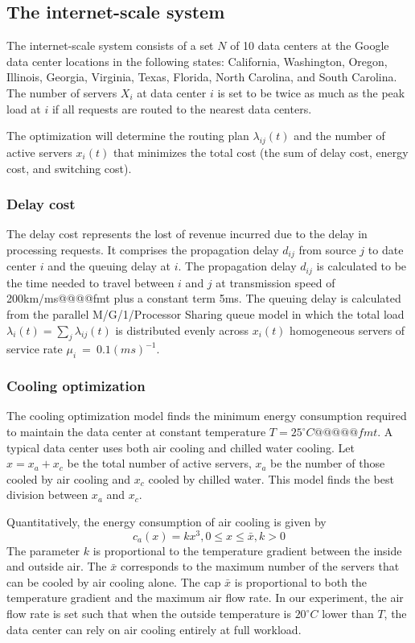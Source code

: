 \documentclass{acm_proc_article-sp}
\begin{document}
\subsection{The internet-scale system}
The internet-scale system consists of a set $N$ of 10 data centers at the Google data center locations in the following states: California, Washington, Oregon, Illinois, Georgia, Virginia, Texas, Florida, North Carolina, and South Carolina. The number of servers $X_i$ at data center $i$ is set to be twice as much as the peak load at $i$ if all requests are routed to the nearest data centers.

The optimization will determine the routing plan $\lambda_{ij}(t)$ and the number of active servers $x_i(t)$ that minimizes the total cost (the sum of delay cost, energy cost, and switching cost).

\subsubsection{Delay cost}
The delay cost represents the lost of revenue incurred due to the delay in processing requests. It comprises the propagation delay $d_{ij}$ from source $j$ to date center $i$ and the queuing delay at $i$.
The propagation delay $d_{ij}$ is calculated to be the time needed to travel between $i$ and $j$ at transmission speed of 200km/ms@@@@fmt plus a constant term 5ms. The queuing delay is calculated from the parallel M/G/1/Processor Sharing queue model in which the total load $\lambda_i(t)=\sum_j \lambda_{ij}(t)$ is distributed evenly across $x_i(t)$ homogeneous servers of service rate \mbox{$\mu_i$ = $0.1(ms)^{-1}$}.

\subsubsection{Cooling optimization}
The cooling optimization model finds the minimum energy consumption required to maintain the data center at constant temperature $T = 25^{\circ}C@@@@@fmt$. A typical data center uses both air cooling and chilled water cooling. Let $x = x_a + x_c$ be the total number of active servers, $x_a$ be the number of those cooled by air cooling and $x_c$ cooled by chilled water. This model finds the best division between $x_a$ and $x_c$. 

Quantitatively, the energy consumption of air cooling is given by 
\begin{equation}
c_a(x) = kx^3, 0 \leq x \leq \bar{x}, k > 0
\end{equation}
The parameter $k$ is proportional to the temperature gradient between the inside and outside air. The $\bar{x}$ corresponds to the maximum number of the servers that can be cooled by air cooling alone. The cap $\bar{x}$ is proportional to both the temperature gradient and the maximum air flow rate. In our experiment, the air flow rate is set such that when the outside temperature is $20^{\circ}C$ lower than $T$, the data center can rely on air cooling entirely at full workload.
\end{document}
